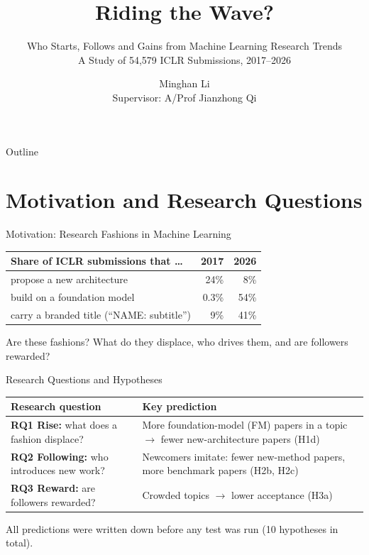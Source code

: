 \documentclass[aspectratio=169,11pt]{beamer}
\title[Riding the Wave?]{Riding the Wave?}
\subtitle{Who Starts, Follows and Gains from Machine Learning Research Trends\texorpdfstring{\\[0.3em]
  \small A Study of 54,579 ICLR Submissions, 2017--2026}{}}
\author[Minghan Li]{Minghan Li\\[0.4em] {\small Supervisor: A/Prof Jianzhong Qi}}
\date{}
\newcommand{\gnote}[1]{{\color{note}#1}}
\newcommand{\rc}[1]{{\color{note}\footnotesize(#1)}}
\begin{document}
\begin{frame}
  \titlepage
\end{frame}

\begin{frame}{Outline}
  \tableofcontents
\end{frame}

\section{Motivation and Research Questions}

\begin{frame}{Motivation: Research Fashions in Machine Learning}
  \begin{table}
    \centering
    \begin{tabular}{@{}lrr@{}}
      \toprule
      Share of ICLR submissions that \ldots & 2017 & 2026 \\
      \midrule
      propose a new architecture & 24\% & 8\% \\
      build on a foundation model & 0.3\% & 54\% \\
      carry a branded title (``NAME: subtitle'') & 9\% & 41\% \\
      \bottomrule
    \end{tabular}
  \end{table}
  \vspace{1.5em}
  \centering
  Are these \alert{fashions}? What do they displace, who drives them, and are followers rewarded?
\end{frame}

\begin{frame}{Research Questions and Hypotheses}
  \begin{table}
    \centering
    \begin{tabularx}{\textwidth}{@{}l >{\raggedright\arraybackslash}X@{}}
      \toprule
      Research question & Key prediction \\
      \midrule
      \textbf{RQ1 Rise:} what does a fashion displace? &
        More foundation-model (FM) papers in a topic $\to$ fewer new-architecture papers \rc{H1d} \\
      \addlinespace
      \textbf{RQ2 Following:} who introduces new work? &
        Newcomers imitate: fewer new-method papers, more benchmark papers \rc{H2b, H2c} \\
      \addlinespace
      \textbf{RQ3 Reward:} are followers rewarded? &
        Crowded topics $\to$ lower acceptance \rc{H3a} \\
      \bottomrule
    \end{tabularx}
  \end{table}
  \gnote{\small All predictions were written down before any test was run (10 hypotheses in total).}
\end{frame}
\end{document}
